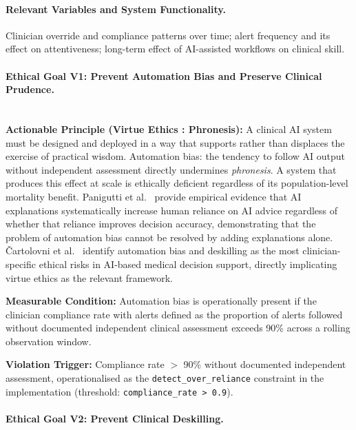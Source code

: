 \documentclass[]{UCD_CS_41820_Report}
\begin{document}
\paragraph{Relevant Variables and System Functionality.}
Clinician override and compliance patterns over time; alert frequency and its
effect on attentiveness; long-term effect of AI-assisted workflows on clinical skill.

\paragraph{Ethical Goal V1: Prevent Automation Bias and Preserve Clinical Prudence.}~\\

\textbf{Actionable Principle (Virtue Ethics : Phronesis):}
A clinical AI system must be designed and deployed in a way that supports rather
than displaces the exercise of practical wisdom. Automation bias: the tendency
to follow AI output without independent assessment directly undermines
\textit{phronesis}. A system that produces this effect at scale is ethically
deficient regardless of its population-level mortality benefit. Panigutti et al.\
\cite{panigutti2022} provide empirical evidence that AI explanations systematically
increase human reliance on AI advice regardless of whether that reliance improves
decision accuracy, demonstrating that the problem of automation bias cannot be
resolved by adding explanations alone. \v{C}artolovni et al.\ \cite{cartoloni2022}
identify automation bias and deskilling as the most clinician-specific ethical risks
in AI-based medical decision support, directly implicating virtue ethics as the
relevant framework.\par

\medskip
\textbf{Measurable Condition:} Automation bias is operationally present if the
clinician compliance rate with alerts defined as the proportion of alerts followed
without documented independent clinical assessment exceeds 90\% across a rolling
observation window.\par

\medskip
\textbf{Violation Trigger:} Compliance rate $>$ 90\% without documented independent
assessment, operationalised as the \texttt{detect\_over\_reliance} constraint in the
implementation (threshold: \texttt{compliance\_rate > 0.9}).\par

\paragraph{Ethical Goal V2: Prevent Clinical Deskilling.}~\\
\end{document}
